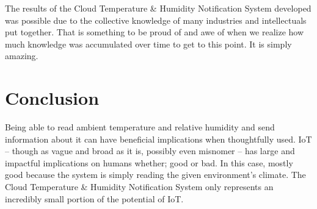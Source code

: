 \documentclass{article}
\begin{document}
The results of the Cloud Temperature \& Humidity Notification System developed was possible due to the collective knowledge of many industries and intellectuals put together. That is something to be proud of and awe of when we realize how much knowledge was accumulated over time to get to this point. It is simply amazing.

\section{Conclusion}
Being able to read ambient temperature and relative humidity and send information about it can have beneficial implications when thoughtfully used. IoT -- though as vague and broad as it is, possibly even misnomer -- has large and impactful implications on humans whether; good or bad. In this case, mostly good because the system is simply reading the given environment's climate. The Cloud Temperature \& Humidity Notification System only represents an incredibly small portion of the potential of IoT.
\end{document}
